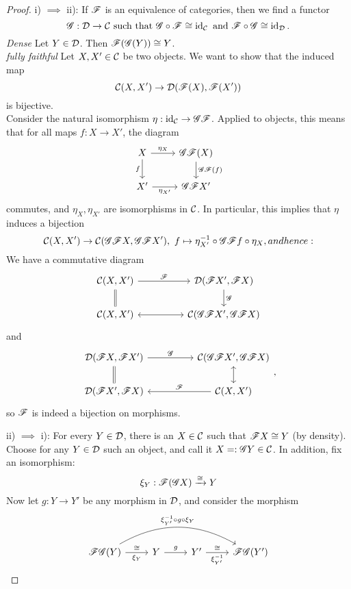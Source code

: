 \begin{proof}
i) $\implies$ ii): If $\mathscr{F}$ is an equivalence of categories, then we find a functor 
\[
\mathscr{G}: \mathcal{D} \to \mathcal{C}\text{ such that } \mathscr{G} \circ \mathscr{F} \cong \operatorname{id}_{\mathcal{C}}\text { and }\mathscr{F} \circ \mathscr{G} \cong \operatorname{id}_{\mathcal{D}}.\]
\textit{Dense} Let $Y\in \mathcal{D}$. Then $\mathscr{F}(\mathscr{G}(Y))\cong Y$.\\
\textit{fully faithful} Let $X,X'\in \mathcal{C}$ be two objects. \coms We want to show that the induced map 
\[
\mathcal{C}(X,X')\to \mathcal{D}(\mathscr{F}(X),\mathscr{F}(X'))
\]
is bijective. \come \\
Consider the natural isomorphism $\eta: \operatorname{id}_{\mathcal{C}}\to \mathscr{G} \mathscr{F}$.
\coms Applied to objects, this means that for all maps $f:X\to X'$, the diagram
\[
\begin{tikzcd}
    X\ar{r}{\eta_X}\ar[swap]{d}{f}&\gfunc \ffunc(X)\ar{d}{\gfunc\ffunc(f)}\\
    X'\ar[swap]{r}{\eta_{X'}}&\gfunc \ffunc X'
\end{tikzcd}
\]
commutes, and $\eta_X,\eta_{X'}$ are isomorphisms in $\mathcal{C}$. In particular, this implies that $\eta$ induces a bijection 
\[
\mathcal{C}(X,X')\to \mathcal{C}(\mathscr{G} \mathscr{F} X,\mathscr{G} \mathscr{F} X'),~f\mapsto \eta_{X'}^{-1}\circ \mathscr{G} \mathscr{F} f \circ \eta_{X}, and hence:
\]
\come
We have a commutative diagram
\[
\begin{tikzcd}
    \ccat(X,X')\ar{rr}{\ffunc}\ar[equal]{d}&&\dcat(\ffunc X',\ffunc X)\ar{d}{\gfunc}\\
    \ccat(X,X')\ar[leftrightarrow]{rr}&&\ccat(\gfunc\ffunc X', \gfunc \ffunc X)
\end{tikzcd}
\]
and 
\[
\begin{tikzcd}
\dcat(\ffunc X,\ffunc X')\ar{rr}{\gfunc}\ar[equal]{d}&&\ccat(\gfunc\ffunc X',\gfunc \ffunc X)\ar[leftrightarrow]{d}\\
\dcat(\ffunc X',\ffunc X)&&\ar[swap]{ll}{\ffunc}\ccat(X,X')
\end{tikzcd},
\]
so $\mathscr{F}$ is indeed a bijection on morphisms.\par 
ii) $\implies$ i): For every $Y\in \mathcal{D}$, there is an $X\in \mathcal{C}$ such that $\mathscr{F} X \cong Y$ (\coms by density\come). Choose for any $Y\in \mathcal{D}$ such an object, and call it $X=:\mathscr{G} Y\in \mathcal{C}$. In addition, fix an isomorphism:
\[
\xi_{Y}: \mathscr{F}(\mathscr{G} X)\xrightarrow{\cong} Y
\]
Now let $g:Y\to Y'$ be any morphism in $\mathcal{D}$, and consider the morphism
\[
\begin{tikzcd}
\ffunc\gfunc(Y)\ar[r,"\cong","\xi_Y"']\ar[bend left]{rrr}{\xi_{Y'}^{-1}\circ g \circ \xi_Y}&Y\ar{r}{g}&Y'\ar[r,"\cong","\xi_{Y'}^{-1}"']&\ffunc \gfunc(Y')

\end{tikzcd}\]
\end{proof}
